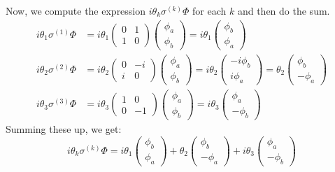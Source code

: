Now, we compute the expression \(i \theta_k \sigma^{(k)} \Phi\) for each \(k\) and then do the sum. 
\begin{align}
i \theta_1 \sigma^{(1)} \Phi &= i \theta_1 \begin{pmatrix} 0 & 1 \\ 1 & 0 \end{pmatrix} \begin{pmatrix} \phi_a \\ \phi_b \end{pmatrix} = i \theta_1 \begin{pmatrix} \phi_b \\ \phi_a \end{pmatrix}
\\
i \theta_2 \sigma^{(2)} \Phi &= i \theta_2 \begin{pmatrix} 0 & -i \\ i & 0 \end{pmatrix} \begin{pmatrix} \phi_a \\ \phi_b \end{pmatrix} = i \theta_2 \begin{pmatrix} -i \phi_b \\ i \phi_a \end{pmatrix} = \theta_2 \begin{pmatrix} \phi_b \\ -\phi_a \end{pmatrix}
\\
i \theta_3 \sigma^{(3)} \Phi &= i \theta_3 \begin{pmatrix} 1 & 0 \\ 0 & -1 \end{pmatrix} \begin{pmatrix} \phi_a \\ \phi_b \end{pmatrix} = i \theta_3 \begin{pmatrix} \phi_a \\ -\phi_b \end{pmatrix}
\end{align}
Summing these up, we get:
\[
i \theta_k \sigma^{(k)} \Phi = i \theta_1 \begin{pmatrix} \phi_b \\ \phi_a \end{pmatrix} + \theta_2 \begin{pmatrix} \phi_b \\ -\phi_a \end{pmatrix} + i \theta_3 \begin{pmatrix} \phi_a \\ -\phi_b \end{pmatrix}
\]
